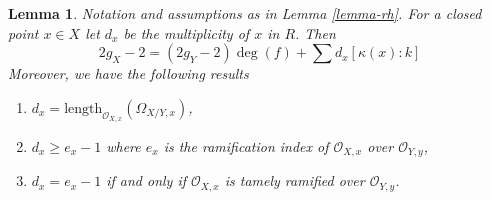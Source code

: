 \documentclass{stacks-project}
\theoremstyle{plain}
\newtheorem{lemma}[subsection]{Lemma}
\theoremstyle{definition}
\theoremstyle{remark}
\numberwithin{equation}{subsection}
\begin{document}
\begin{lemma}
\label{lemma-rhe}
Notation and assumptions as in Lemma \ref{lemma-rh}. For a closed point
$x \in X$ let $d_x$ be the multiplicity of $x$ in $R$. Then
$$
2g_X - 2 = (2g_Y - 2) \deg(f) + \sum\nolimits d_x [\kappa(x) : k]
$$
Moreover, we have the following results
\begin{enumerate}
\item $d_x = \text{length}_{\mathcal{O}_{X, x}}(\Omega_{X/Y, x})$,
\item $d_x \geq e_x - 1$ where $e_x$ is the ramification index
of $\mathcal{O}_{X, x}$ over $\mathcal{O}_{Y, y}$,
\item $d_x = e_x - 1$ if and only if $\mathcal{O}_{X, x}$ is tamely
ramified over $\mathcal{O}_{Y, y}$.
\end{enumerate}
\end{lemma}
\end{document}
